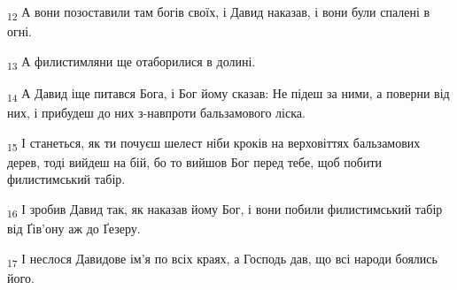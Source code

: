 \begin{tcolorbox}
\textsubscript{12} А вони позоставили там богів своїх, і Давид наказав, і вони були спалені в огні.
\end{tcolorbox}
\begin{tcolorbox}
\textsubscript{13} А филистимляни ще отаборилися в долині.
\end{tcolorbox}
\begin{tcolorbox}
\textsubscript{14} А Давид іще питався Бога, і Бог йому сказав: Не підеш за ними, а поверни від них, і прибудеш до них з-навпроти бальзамового ліска.
\end{tcolorbox}
\begin{tcolorbox}
\textsubscript{15} І станеться, як ти почуєш шелест ніби кроків на верховіттях бальзамових дерев, тоді вийдеш на бій, бо то вийшов Бог перед тебе, щоб побити филистимський табір.
\end{tcolorbox}
\begin{tcolorbox}
\textsubscript{16} І зробив Давид так, як наказав йому Бог, і вони побили филистимський табір від Ґів'ону аж до Ґезеру.
\end{tcolorbox}
\begin{tcolorbox}
\textsubscript{17} І неслося Давидове ім'я по всіх краях, а Господь дав, що всі народи боялись його.
\end{tcolorbox}
